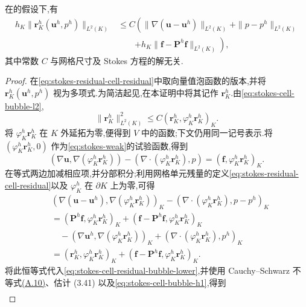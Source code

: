 \begin{lemma}[网格单元残量的局部估计]\label{lem:stokes-cell-residual-local-estimate}
在的假设下,有
\begingroup\small
\begin{equation}\label{eq:stokes-cell-residual-local-estimate}
\begin{aligned}
 h_K\|\bm{r}_K^h(\bm{u}^h,p^h)\|_{L^2(K)}
 &\leq C\left(
   \|\nabla(\bm{u}-\bm{u}^h)\|_{L^2(K)}
   +\|p-p^h\|_{L^2(K)}\right.\\
 &\qquad\left.
   +h_K\|\bm{f}-\bm{P}^h\bm{f}\|_{L^2(K)}
 \right),
\end{aligned}
\end{equation}
\endgroup
其中常数 $C$ 与网格尺寸及 Stokes 方程的解无关.
\end{lemma}
\begin{proof}
在\cref{eq:stokes-residual-cell-residual}中取向量值泡函数的版本,并将 $\bm{r}_K^h(\bm{u}^h,p^h)$ 视为多项式.为简洁起见,在本证明中将其记作 $\bm{r}_K^h$.由\cref{eq:stokes-cell-bubble-l2},
\begin{equation}\label{eq:stokes-cell-residual-bubble-lower}
 \|\bm{r}_K^h\|_{L^2(K)}^2
 \leq C(\bm{r}_K^h,\varphi_K^h\bm{r}_K^h)_K.
\end{equation}
将 $\varphi_K^h\bm{r}_K^h$ 在 $K$ 外延拓为零,便得到 $V$ 中的函数;下文仍用同一记号表示.将 $(\varphi_K^h\bm{r}_K^h,0)$ 作为\cref{eq:stokes-weak}的试验函数,得到
\[
 (\nabla\bm{u},\nabla(\varphi_K^h\bm{r}_K^h))
 -(\nabla\cdot(\varphi_K^h\bm{r}_K^h),p)
 =(\bm{f},\varphi_K^h\bm{r}_K^h)_K.
\]
在等式两边加减相应项,并分部积分;利用网格单元残量的定义\cref{eq:stokes-residual-cell-residual}以及 $\varphi_K^h$ 在 $\partial K$ 上为零,可得
\begin{align*}
 &(\nabla(\bm{u}-\bm{u}^h),
       \nabla(\varphi_K^h\bm{r}_K^h))_K
  -(\nabla\cdot(\varphi_K^h\bm{r}_K^h),p-p^h)_K\\
 &= (\bm{P}^h\bm{f},\varphi_K^h\bm{r}_K^h)_K
   +(\bm{f}-\bm{P}^h\bm{f},
        \varphi_K^h\bm{r}_K^h)_K\\
 &\quad-(\nabla\bm{u}^h,
        \nabla(\varphi_K^h\bm{r}_K^h))_K
   +(\nabla\cdot(\varphi_K^h\bm{r}_K^h),p^h)_K\\
 &= (\bm{r}_K^h,\varphi_K^h\bm{r}_K^h)_K
   +(\bm{f}-\bm{P}^h\bm{f},
        \varphi_K^h\bm{r}_K^h)_K.
\end{align*}
将此恒等式代入\cref{eq:stokes-cell-residual-bubble-lower},并使用 Cauchy--Schwarz 不等式\hyperref[eq:appendix-a-10]{(A.10)}、估计 (3.41) 以及\cref{eq:stokes-cell-bubble-h1},得到
{\small
\[
\begin{aligned}

\end{aligned}\]}
\end{proof}
